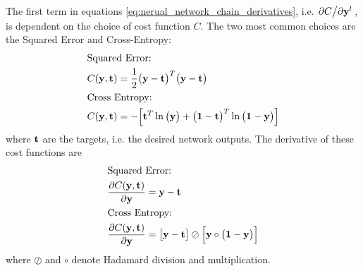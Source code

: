 \documentclass[nofootinbib,reprint,english]{revtex4-1}
\begin{document}
The first term in equations \eqref{eq:nerual_network_chain_derivatives}, i.e. \(\pdv*{C}{\vb{y}^l}\), is dependent on the choice of cost function \(C\). The two most common choices are the Squared Error and Cross-Entropy:
\begin{subequations}
\begin{align}
&\text{Squared Error:}\nonumber\\
&C(\vb{y},\vb{t})=\frac{1}{2}\big(\vb{y}-\vb{t}\big)^T\big(\vb{y}-\vb{t}\big) \\
&\text{Cross Entropy:}\nonumber\\
&C(\vb{y},\vb{t})=-\Big[\vb{t}^T\ln\big(\vb{y}\big)+\big(\vb{1}-\vb{t}\big)^T\ln\big(\vb{1}-\vb{y}\big)\Big]\label{eq:neural_networks_cross_entropy}
\end{align}
\end{subequations}
where \(\vb{t}\) are the targets, i.e. the desired network outputs. The derivative of these cost functions are
\begin{subequations}
\begin{align}
&\text{Squared Error:}\nonumber\\
&\pdv{C(\vb{y},\vb{t})}{\vb{y}}=\vb{y}-\vb{t} \\
&\text{Cross Entropy:}\nonumber\\
&\pdv{C(\vb{y},\vb{t})}{\vb{y}}=\big[\vb{y}-\vb{t}\big]\oslash\Big[\vb{y}\circ\big(\vb{1}-\vb{y}\big)\Big]
\end{align}
\end{subequations}
where \(\oslash\) and \(\circ\) denote Hadamard division and multiplication.
\end{document}
